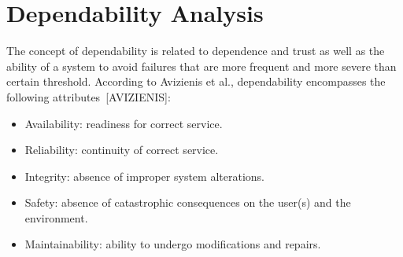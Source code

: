 \section{Dependability Analysis}

The concept of dependability is related to dependence and trust as well as the ability of a system to avoid failures that are more frequent and more severe than certain threshold. According to Avizienis et al., dependability encompasses the following attributes~[AVIZIENIS]: 

\begin{itemize}

\item Availability: readiness for correct service.
\medskip

\item Reliability: continuity of correct service.

\item Integrity: absence of improper system alterations.
\medskip

\item Safety: absence of catastrophic consequences on the user(s) and the environment.
\medskip

\item Maintainability: ability to undergo modifications and repairs.
\medskip

\end{itemize}

